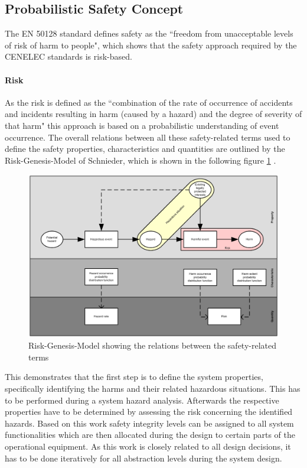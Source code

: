 \documentclass{template/openetcs_report}
\begin{document}
\subsection{Probabilistic Safety Concept}

The EN 50128 standard defines safety as the ``freedom from unacceptable levels of risk of harm to people", which shows that the safety approach required by the CENELEC standards is risk-based.

\paragraph{Risk}

 As the risk is defined as the ``combination of the rate of occurrence of accidents and incidents resulting in harm (caused by a hazard) and the degree of severity  of that harm" this approach is based on a probabilistic understanding of event occurrence. The overall relations between all these safety-related terms used to define the safety properties, characteristics and quantities are outlined by the Risk-Genesis-Model of Schnieder, which is shown in the following figure \ref{fig:Risiko-Genese-Modell-eng} \cite{Schnieder.2010}.

\begin{figure}[htbp]
\centering
\includegraphics[width=0.8\linewidth]{bld_2013-06-19_Risiko-Genese-Modell-eng-2-0_jw}
\caption{Risk-Genesis-Model showing the relations between the safety-related terms \cite{Schnieder.2010}}
\label{fig:Risiko-Genese-Modell-eng}
\end{figure}

This demonstrates that the first step is to define the system properties, specifically identifying the harms and their related hazardous situations. This has to be performed during a system hazard analysis. Afterwards the respective properties have to be determined by assessing the risk concerning the identified hazards. Based on this work safety integrity levels can be assigned to all system functionalities which are then allocated during the design to certain parts of the operational equipment. As this work is closely related to all design decisions, it has to be done iteratively for all abstraction levels during the system design. 
\end{document}
